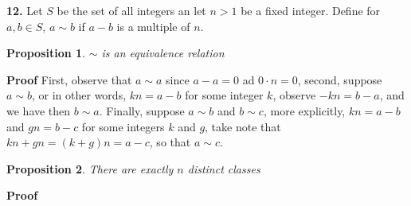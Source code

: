 \documentclass[11pt,a4paper]{article}
\newtheorem{claim}{Proposition}
\begin{document}
\textbf{12.} Let $S$ be the set of all integers an let $ n >1$ be a fixed integer. Define for $a,b \in S$, $a \sim b$ if $ a - b$ is a multiple of $n$. 
\begin{claim}
	$\sim$ is an equivalence relation
\end{claim}
\textbf{Proof}
First, observe that $ a \sim a$ since $ a - a = 0$ ad $0 \cdot n = 0$, second, suppose $ a \sim b$, or in other words, $ kn = a -b$ for some integer $k$, observe $ -kn = b - a$, and we have then $ b \sim a$. Finally, suppose $ a \sim b$ and $b \sim c$, more explicitly, $kn = a -b$ and $gn = b -c$ for some integers $k$ and $g$, take note that $kn + gn = (k +g)n = a -c$, so that $ a \sim c$. \par 
\begin{claim}
	There are exactly $n$ distinct classes
\end{claim}
\textbf{Proof}

	
\end{document}
